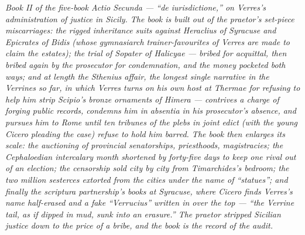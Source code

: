
\textit{Book II of the five-book Actio Secunda --- ``de iurisdictione,''
on Verres's administration of justice in Sicily. The book is built out
of the praetor's set-piece miscarriages: the rigged inheritance suits
against Heraclius of Syracuse and Epicrates of Bidis (whose gymnasiarch
trainer-favourites of Verres are made to claim the estates); the
trial of Sopater of Halicyae --- bribed for acquittal, then bribed
again by the prosecutor for condemnation, and the money pocketed
both ways; and at length the Sthenius affair, the longest single
narrative in the Verrines so far, in which Verres turns on his own
host at Thermae for refusing to help him strip Scipio's bronze
ornaments of Himera --- contrives a charge of forging public records,
condemns him in absentia in his prosecutor's absence, and pursues
him to Rome until ten tribunes of the plebs in joint edict (with the
young Cicero pleading the case) refuse to hold him barred. The book
then enlarges its scale: the auctioning of provincial senatorships,
priesthoods, magistracies; the Cephaloedian intercalary month
shortened by forty-five days to keep one rival out of an election;
the censorship sold city by city from Timarchides's bedroom; the
two million sesterces extorted from the cities under the name of
``statues''; and finally the scriptura partnership's books at
Syracuse, where Cicero finds Verres's name half-erased and a fake
``Verrucius'' written in over the top --- ``the Verrine tail, as if
dipped in mud, sunk into an erasure.'' The praetor stripped
Sicilian justice down to the price of a bribe, and the book is the
record of the audit.}
